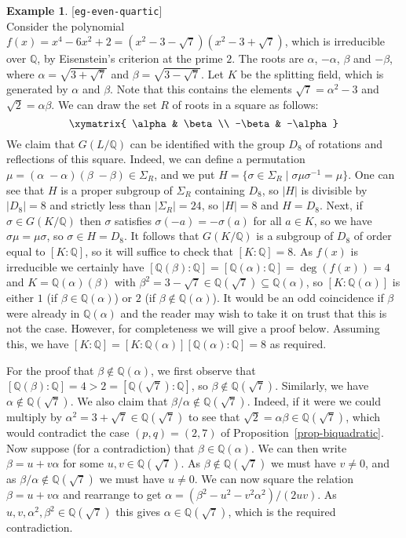 \documentclass{amsart}
\newcommand{\lbl}[1]{\label{#1}\textup{[\texttt{#1}]}\ \\}
\newcommand{\lbl}{\label}
\newcommand{\Q}         {{\mathbb{Q}}}
\newcommand{\al}        {\alpha}
\newcommand{\bt}        {\beta}
\newcommand{\sg}        {\sigma}
\newcommand{\Sg}        {\Sigma}
\newcommand{\st}        {\;|\;}
\newcommand{\sse}       {\subseteq}
\renewcommand{\:}{\colon}
\theoremstyle{definition}
\newtheorem{example}[theorem]{Example}
\begin{document}
\begin{example}\lbl{eg-even-quartic}
 Consider the polynomial
 $f(x)=x^4-6x^2+2=(x^2-3-\sqrt{7})(x^2-3+\sqrt{7})$, which is 
 irreducible over $\Q$, by Eisenstein's criterion at the prime $2$.
 The roots are $\al$, $-\al$, $\bt$ and $-\bt$, where
 $\al=\sqrt{3+\sqrt{7}}$ and $\bt=\sqrt{3-\sqrt{7}}$.  Let $K$ be the
 splitting field, which is generated by $\al$ and $\bt$.  Note that
 this contains the elements $\sqrt{7}=\al^2-3$ and $\sqrt{2}=\al\bt$.
 We can draw the set $R$ of roots in a square as follows:
 \[ \xymatrix{ 
   \al & \bt \\
   -\bt & -\al 
 } \]
 We claim that $G(L/\Q)$ can be identified with the group $D_8$ of
 rotations and reflections of this square.  Indeed, we can define a
 permutation $\mu=(\al\;-\al)(\bt\;-\bt)\in\Sg_R$, and we put
 $H=\{\sg\in\Sg_R\st\sg\mu\sg^{-1}=\mu\}$.  One can see that $H$ is a
 proper subgroup of $\Sg_R$ containing $D_8$, so $|H|$ is divisible by
 $|D_8|=8$ and strictly less than $|\Sg_R|=24$, so $|H|=8$ and
 $H=D_8$.  Next, if $\sg\in G(K/\Q)$ then $\sg$ satisfies
 $\sg(-a)=-\sg(a)$ for all $a\in K$, so we have $\sg\mu=\mu\sg$, so
 $\sg\in H=D_8$.  It follows that $G(K/\Q)$ is a subgroup of $D_8$ of
 order equal to $[K:\Q]$, so it will suffice to check that
 $[K:\Q]=8$.  As $f(x)$ is irreducible we certainly have
 $[\Q(\bt):\Q]=[\Q(\al):\Q]=\deg(f(x))=4$ and $K=\Q(\al)(\bt)$ with
 $\bt^2=3-\sqrt{7}\in\Q(\sqrt{7})\sse\Q(\al)$, so $[K:\Q(\al)]$ is
 either $1$ (if $\bt\in\Q(\al)$) or $2$ (if $\bt\not\in\Q(\al)$).  It
 would be an odd coincidence if $\bt$ were already in $\Q(\al)$ and
 the reader may wish to take it on trust that this is not the case.
 However, for completeness we will give a proof below.  Assuming this,
 we have $[K:\Q]=[K\:\Q(\al)][\Q(\al):\Q]=8$ as required. 

 For the proof that $\bt\not\in\Q(\al)$, we first observe that
 $[\Q(\bt):\Q]=4>2=[\Q(\sqrt{7}):\Q]$, so $\bt\not\in\Q(\sqrt{7})$.
 Similarly, we have $\al\not\in\Q(\sqrt{7})$.  We also claim that
 $\bt/\al\not\in\Q(\sqrt{7})$.  Indeed, if it were we could multiply by
 $\al^2=3+\sqrt{7}\in\Q(\sqrt{7})$ to see that
 $\sqrt{2}=\al\bt\in\Q(\sqrt{7})$, which would contradict the case
 $(p,q)=(2,7)$ of Proposition~\ref{prop-biquadratic}.  Now suppose
 (for a contradiction) that $\bt\in\Q(\al)$.  We can then write
 $\bt=u+v\al$ for some $u,v\in\Q(\sqrt{7})$.  As
 $\bt\not\in\Q(\sqrt{7})$ we must have $v\neq 0$, and as
 $\bt/\al\not\in\Q(\sqrt{7})$ we must have $u\neq 0$.  We can now
 square the relation $\bt=u+v\al$ and rearrange to get
 $\al=(\bt^2-u^2-v^2\al^2)/(2uv)$.  As
 $u,v,\al^2,\bt^2\in\Q(\sqrt{7})$ this gives $\al\in\Q(\sqrt{7})$,
 which is the required contradiction. 
\end{example}
\end{document}
